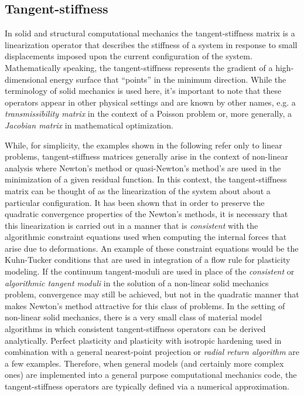 \documentclass[preprint,12pt]{elsarticle}
\begin{document}
\subsection{Tangent-stiffness} 
\label{subsec:TS}
In solid and structural computational mechanics the tangent-stiffness matrix is
a linearization operator that describes the stiffness of a system in response
to small displacements imposed upon the current configuration of the system.
Mathematically speaking, the tangent-stiffness represents the gradient of a
high-dimensional energy surface that ``points'' in the minimum direction. While
the terminology of solid mechanics is used here, it's important to note that
these operators appear in other physical settings and are known by other names,
e.g. a \emph{transmissibility matrix} in the context of a Poisson problem or,
more generally, a \emph{Jacobian matrix} in mathematical optimization.

While, for simplicity, the examples shown in the following refer only to linear
problems, tangent-stiffness matrices generally arise in the context of
non-linear analysis where Newton's method or quasi-Newton's method's are used
in the minimization of a given residual function.  In this context, the
tangent-stiffness matrix can be thought of as the linearization of the system
about about a particular configuration.  It has been shown
\cite{hughes1978consistent,hughes1978unconditionally} that in order to preserve
the quadratic convergence properties of the Newton's methods, it is necessary
that this linearization is carried out in a manner that is \emph{consistent}
with the algorithmic constraint equations used when computing the internal
forces that arise due to deformations.  An example of these constraint
equations would be the Kuhn-Tucker conditions \cite{simo1998} that are used in
integration of a flow rule for plasticity modeling.  If the continuum
tangent-moduli are used in place of the \emph{consistent} or \emph{algorithmic
tangent moduli} in the solution of a non-linear solid mechanics problem,
convergence may still be achieved, but not in the quadratic manner that makes
Newton's method attractive for this class of problems.  In the setting of
non-linear solid mechanics, there is a very small class of material model
algorithms in which consistent tangent-stiffness operators can be derived
analytically.  Perfect plasticity and plasticity with isotropic hardening used
in combination with a general nearest-point projection or \emph{radial return
algorithm} are a few examples.  Therefore, when general models (and certainly
more complex ones) are implemented into a general purpose computational
mechanics code, the tangent-stiffness operators are typically defined via a
numerical approximation.  
\end{document}
